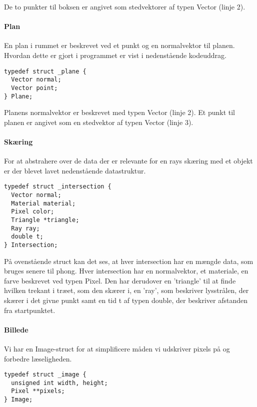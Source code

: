 De to punkter til boksen er angivet som stedvektorer af typen Vector (linje 2).

\paragraph{Plan}
En plan i rummet er beskrevet ved et punkt og en normalvektor til planen. Hvordan dette er gjort i programmet er vist i nedenstående kodeuddrag. 

\begin{lstlisting}[style=Cstyle, caption=Struct til plan]
typedef struct _plane {
  Vector normal;
  Vector point;
} Plane;
\end{lstlisting}

Planens normalvektor er beskrevet med typen Vector (linje 2). Et punkt til planen er angivet som en stedvektor af typen Vector (linje 3).

\paragraph{Skæring}
For at abstrahere over de data der er relevante for en rays skæring med et objekt er der blevet lavet nedenstående datastruktur.

\begin{lstlisting}[style=Cstyle, caption=Struct til intersection]
typedef struct _intersection {
  Vector normal;
  Material material;
  Pixel color;
  Triangle *triangle;
  Ray ray;
  double t;
} Intersection;
\end{lstlisting}

På ovenstående struct kan det ses, at hver intersection har en mængde data, som bruges senere til phong. Hver intersection har en normalvektor, et materiale, en farve beskrevet ved typen Pixel. Den har derudover en 'triangle' til at finde hvilken trekant i træet, som den skærer i, en 'ray', som beskriver lysstrålen, der skærer i det givne punkt samt en tid t af typen double, der beskriver afstanden fra startpunktet.

\paragraph{Billede}
Vi har en Image-struct for at simplificere måden vi udskriver pixels på og forbedre læseligheden.

\begin{lstlisting}[style=Cstyle, caption=Struct til Image]
typedef struct _image {
  unsigned int width, height;
  Pixel **pixels;
} Image;
\end{lstlisting}

